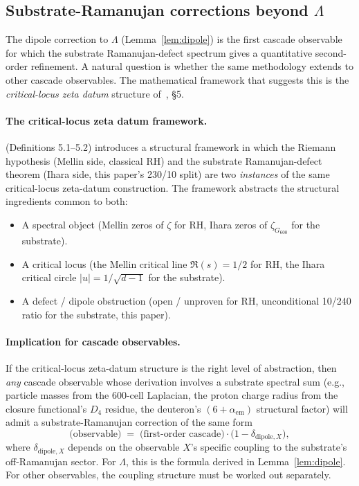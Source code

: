 \documentclass[11pt]{article}
\theoremstyle{plain}
\theoremstyle{definition}
\theoremstyle{remark}
\begin{document}
\subsection{Substrate-Ramanujan corrections beyond $\Lambda$}\label{sec:lambda-beyond}

The dipole correction to $\Lambda$ (Lemma~\ref{lem:dipole}) is the first cascade observable for which the substrate Ramanujan-defect spectrum gives a quantitative second-order refinement. A natural question is whether the same methodology extends to other cascade observables. The mathematical framework that suggests this is the \emph{critical-locus zeta datum} structure of~\citet{rhTwoSphere}, §5.

\paragraph{The critical-locus zeta datum framework.} \citet{rhTwoSphere} (Definitions 5.1--5.2) introduces a structural framework in which the Riemann hypothesis (Mellin side, classical RH) and the substrate Ramanujan-defect theorem (Ihara side, this paper's 230/10 split) are two \emph{instances} of the same critical-locus zeta-datum construction. The framework abstracts the structural ingredients common to both:
\begin{itemize}[leftmargin=2em]
\item A spectral object (Mellin zeros of $\zeta$ for RH, Ihara zeros of $\zeta_{G_{600}}$ for the substrate).
\item A critical locus (the Mellin critical line $\Re(s) = 1/2$ for RH, the Ihara critical circle $|u| = 1/\sqrt{d-1}$ for the substrate).
\item A defect / dipole obstruction (open / unproven for RH, unconditional 10/240 ratio for the substrate, this paper).
\end{itemize}

\paragraph{Implication for cascade observables.} If the critical-locus zeta-datum structure is the right level of abstraction, then \emph{any} cascade observable whose derivation involves a substrate spectral sum (e.g., particle masses from the 600-cell Laplacian, the proton charge radius from the closure functional's $D_4$ residue, the deuteron's $(6 + \alpha_\mathrm{em})$ structural factor) will admit a substrate-Ramanujan correction of the same form
\[
  \text{(observable)} \;=\; \text{(first-order cascade)} \cdot \Big(1 - \delta_{\mathrm{dipole},X}\Big),
\]
where $\delta_{\mathrm{dipole},X}$ depends on the observable $X$'s specific coupling to the substrate's off-Ramanujan sector. For $\Lambda$, this is the formula derived in Lemma~\ref{lem:dipole}. For other observables, the coupling structure must be worked out separately.
\end{document}
